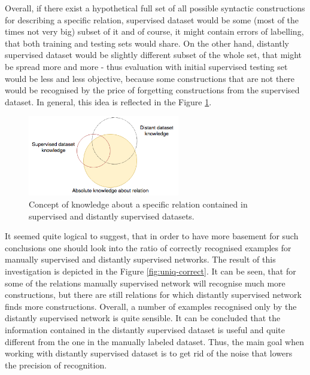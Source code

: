 Overall, if there exist a hypothetical full set of all possible syntactic constructions for describing a specific relation, 
supervised dataset would be some (most of the times not very big) subset of it and of course, 
it might contain errors of labelling, that both training and testing sets would share. On the 
other hand, distantly supervised dataset would be slightly different subset of the whole set, that 
might be spread more and more - thus evaluation with initial supervised testing set would be less 
and less objective, because some constructions that are not there would be recognised by the 
price of forgetting constructions from the supervised dataset. In general, this idea is reflected in the Figure \ref{fig:dist-superv-knowledge}.

\begin{figure}[H]
\centering
\includegraphics[width=250px]{chapter4_experiments/images/dist-superv-knowledge.png}
\caption[Relation of supervised and distantly supervised knowledge]{Concept of knowledge about a specific relation contained in supervised and distantly supervised datasets.}
\label{fig:dist-superv-knowledge}
\end{figure}

It seemed quite logical to suggest, that in order to have more basement for such conclusions one should look into the ratio of correctly
recognised examples for manually supervised and distantly supervised networks. The result of this investigation is depicted in the 
Figure \ref{fig:uniq-correct}. It can be seen, that for some of the relations manually supervised network will recognise much more 
constructions, but there are still relations for which distantly supervised network finds more constructions. Overall, a number of 
examples recognised only by the distantly supervised network is quite sensible. It can be concluded that the information contained 
in the distantly supervised dataset is useful and quite different from the one in the manually labeled dataset. Thus, the main 
goal when working with distantly supervised dataset is to get rid of the noise that lowers the precision of recognition.

